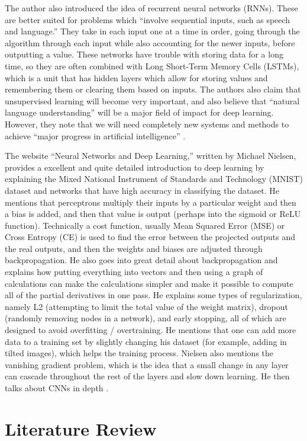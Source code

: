 \documentclass[]{report}
\begin{document}
The author also introduced the idea of recurrent neural networks (RNNs). These are better suited for problems which “involve sequential inputs, such as speech and language.” They take in each input one at a time in order, going through the algorithm through each input while also accounting for the newer inputs, before outputting a value. These networks have trouble with storing data for a long time, so they are often combined with Long Short-Term Memory Cells (LSTMs), which is a unit that has hidden layers which allow for storing values and remembering them or clearing them based on inputs.
The authors also claim that unsupervised learning will become very important, and also believe that “natural language understanding” will be a major field of impact for deep learning. However, they note that we will need completely new systems and methods to achieve “major progress in artificial intelligence” \cite{ThreeGiants}.

The website “Neural Networks and Deep Learning,” written by Michael Nielsen, provides a excellent and quite detailed introduction to deep learning by explaining the Mixed National Instrument of Standards and Technology (MNIST) dataset and networks that have high accuracy in classifying the dataset. He mentions that perceptrons multiply their inputs by a particular weight and then a bias is added, and then that value is output (perhaps into the sigmoid or ReLU function). Technically a cost function, usually Mean Squared Error (MSE) or Cross Entropy (CE) is used to find the error between the projected outputs and the real outputs, and then the weights and biases are adjusted through backpropagation. He also goes into great detail about backpropagation and explains how putting everything into vectors and then using a graph of calculations can make the calculations simpler and make it possible to compute all of the partial derivatives in one pass. He explains some types of regularization, namely L2 (attempting to limit the total value of the weight matrix), dropout (randomly removing nodes in a network), and early stopping, all of which are designed to avoid overfitting / overtraining. He mentions that one can add more data to a training set by slightly changing his dataset (for example, adding in tilted images), which helps the training process. Nielsen also mentions the vanishing gradient problem, which is the idea that a small change in any layer can cascade throughout the rest of the layers and slow down learning. He then talks about CNNs in depth \cite{NNDL}.

\section{Literature Review}
\end{document}
